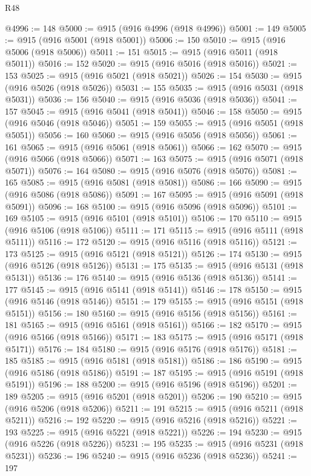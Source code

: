 \begin{lexlean}{R48}
\begin{coremodule}
@4996 := 148
@5000 := @915 (@916 @4996 (@918 @4996))
@5001 := 149
@5005 := @915 (@916 @5001 (@918 @5001))
@5006 := 150
@5010 := @915 (@916 @5006 (@918 @5006))
@5011 := 151
@5015 := @915 (@916 @5011 (@918 @5011))
@5016 := 152
@5020 := @915 (@916 @5016 (@918 @5016))
@5021 := 153
@5025 := @915 (@916 @5021 (@918 @5021))
@5026 := 154
@5030 := @915 (@916 @5026 (@918 @5026))
@5031 := 155
@5035 := @915 (@916 @5031 (@918 @5031))
@5036 := 156
@5040 := @915 (@916 @5036 (@918 @5036))
@5041 := 157
@5045 := @915 (@916 @5041 (@918 @5041))
@5046 := 158
@5050 := @915 (@916 @5046 (@918 @5046))
@5051 := 159
@5055 := @915 (@916 @5051 (@918 @5051))
@5056 := 160
@5060 := @915 (@916 @5056 (@918 @5056))
@5061 := 161
@5065 := @915 (@916 @5061 (@918 @5061))
@5066 := 162
@5070 := @915 (@916 @5066 (@918 @5066))
@5071 := 163
@5075 := @915 (@916 @5071 (@918 @5071))
@5076 := 164
@5080 := @915 (@916 @5076 (@918 @5076))
@5081 := 165
@5085 := @915 (@916 @5081 (@918 @5081))
@5086 := 166
@5090 := @915 (@916 @5086 (@918 @5086))
@5091 := 167
@5095 := @915 (@916 @5091 (@918 @5091))
@5096 := 168
@5100 := @915 (@916 @5096 (@918 @5096))
@5101 := 169
@5105 := @915 (@916 @5101 (@918 @5101))
@5106 := 170
@5110 := @915 (@916 @5106 (@918 @5106))
@5111 := 171
@5115 := @915 (@916 @5111 (@918 @5111))
@5116 := 172
@5120 := @915 (@916 @5116 (@918 @5116))
@5121 := 173
@5125 := @915 (@916 @5121 (@918 @5121))
@5126 := 174
@5130 := @915 (@916 @5126 (@918 @5126))
@5131 := 175
@5135 := @915 (@916 @5131 (@918 @5131))
@5136 := 176
@5140 := @915 (@916 @5136 (@918 @5136))
@5141 := 177
@5145 := @915 (@916 @5141 (@918 @5141))
@5146 := 178
@5150 := @915 (@916 @5146 (@918 @5146))
@5151 := 179
@5155 := @915 (@916 @5151 (@918 @5151))
@5156 := 180
@5160 := @915 (@916 @5156 (@918 @5156))
@5161 := 181
@5165 := @915 (@916 @5161 (@918 @5161))
@5166 := 182
@5170 := @915 (@916 @5166 (@918 @5166))
@5171 := 183
@5175 := @915 (@916 @5171 (@918 @5171))
@5176 := 184
@5180 := @915 (@916 @5176 (@918 @5176))
@5181 := 185
@5185 := @915 (@916 @5181 (@918 @5181))
@5186 := 186
@5190 := @915 (@916 @5186 (@918 @5186))
@5191 := 187
@5195 := @915 (@916 @5191 (@918 @5191))
@5196 := 188
@5200 := @915 (@916 @5196 (@918 @5196))
@5201 := 189
@5205 := @915 (@916 @5201 (@918 @5201))
@5206 := 190
@5210 := @915 (@916 @5206 (@918 @5206))
@5211 := 191
@5215 := @915 (@916 @5211 (@918 @5211))
@5216 := 192
@5220 := @915 (@916 @5216 (@918 @5216))
@5221 := 193
@5225 := @915 (@916 @5221 (@918 @5221))
@5226 := 194
@5230 := @915 (@916 @5226 (@918 @5226))
@5231 := 195
@5235 := @915 (@916 @5231 (@918 @5231))
@5236 := 196
@5240 := @915 (@916 @5236 (@918 @5236))
@5241 := 197

\end{coremodule}
\end{lexlean}
